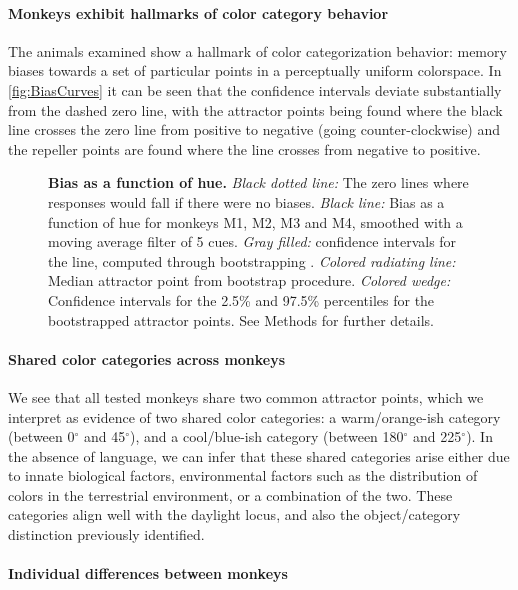 
\paragraph{Monkeys exhibit hallmarks of color category behavior}

The animals examined show a hallmark of color categorization behavior: memory biases towards a set of particular points in a perceptually uniform colorspace.
In \autoref{fig:BiasCurves} it can be seen that the confidence intervals deviate substantially from the dashed zero line, with the attractor points being found where the black line crosses the zero line from positive to negative (going counter-clockwise) and the repeller points are found where the line crosses from negative to positive. 

\begin{figure}

\caption{\textbf{Bias as a function of hue.} 
\emph{Black dotted line:} The zero lines where responses would fall if there were no biases.
\emph{Black line:} Bias as a function of hue for monkeys M1, M2, M3 and M4, smoothed with a moving average filter of 5 cues. 
\emph{Gray filled:} confidence intervals for the line, computed through bootstrapping . 
\emph{Colored radiating line:} Median attractor point from bootstrap procedure.
\emph{Colored wedge:} Confidence intervals for the 2.5\% and 97.5\% percentiles for the bootstrapped attractor points.
See Methods for further details.} %
\label{fig:BiasCurves}
\end{figure}


\paragraph{Shared color categories across monkeys}

We see that all tested monkeys share two common attractor points, which we interpret as evidence of two shared color categories: a warm/orange-ish category (between 0$^\circ$ and 45$^\circ$), and a cool/blue-ish category (between 180$^\circ$ and 225$^\circ$).
In the absence of language, we can infer that these shared categories arise either due to innate biological factors, environmental factors such as the distribution of colors in the terrestrial environment, or a combination of the two.
These categories align well with the daylight locus, and also the object/category distinction previously identified.

\paragraph{Individual differences between monkeys}

